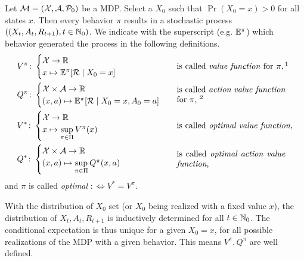 \begin{definition} Let \(\mathcal{M}=(\mathcal{X},\mathcal{A},\mathcal{P}_0)\) be a MDP. Select a \(X_0\) such that \(\Pr({X_0=x})>0\) for all states \(x\). Then every behavior \(\pi\) results in a stochastic process \(((X_t,A_t,R_{t+1}), t\in \mathbb{N}_0)\).
We indicate with the superscript (e.g. \(\mathbb{E}^\pi\)) which behavior generated the process in the following definitions.
\begin{align*}
	&V^\pi\colon
	\begin{cases}
		\cX\to\R\\
		x\mapsto \E^\pi[\cR\mid X_0=x]
	\end{cases} 
	&& \text{is called \emph{value function} for } \pi, \footnotemark[1]
	\\
	&Q^\pi\colon
	\begin{cases}
		\cX\times\cA\to\R\\
		(x,a)\mapsto \E^\pi[\cR\mid X_0=x, A_0=a]
	\end{cases}
	&& \parbox{13em}{is called \emph{action value function} for \(\pi\), \footnotemark[2]}
	\\
	&V^*\colon
	\begin{cases}
		\cX\to\R\\
		x\mapsto \sup\limits_{\pi\in\Pi} V^\pi(x)
	\end{cases} 
	&& \text{is called \emph{optimal value function},}
	\\
	&Q^*\colon
	\begin{cases}
		\cX\times\cA\to\R\\
		(x,a)\mapsto \sup\limits_{\pi\in\Pi} Q^\pi(x,a)
	\end{cases}
	&& \parbox{13em}{is called \emph{optimal action value function},}
\end{align*}
and \(\pi\) is called \emph{optimal} \(:\iff V^*=V^\pi\).
\end{definition}

\begin{remark}
With the distribution of \(X_0\) set (or \(X_0\) being realized with a fixed value \(x\)), the distribution of \(X_t, A_t,R_{t+1}\) is inductively determined for all \(t\in\mathbb{N}_0\). The conditional expectation is thus unique for a given \(X_0=x\), for all possible realizations of the MDP with a given behavior.
This means \(V^\pi, Q^\pi\) are well defined.
\end{remark}

